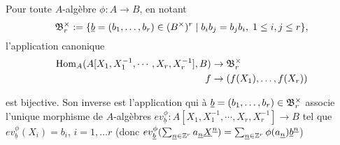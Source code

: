 \begin{definition}Pour toute $A$-algèbre $\phi:A\rightarrow B$, en notant
 $$\frak{B}^\times_r:= \lbrace \underline{b}=(b_1,\dots, b_r)\in (B^\times)^r\;|\; b_ib_j=b_jb_i,\; 1\leq i,j\leq r\rbrace,$$  l'application canonique
	\begin{align*} \operatorname{Hom}_A(A[X_1,X_1^{-1},\cdots, X_r,X_r^{-1}],B) &\to \frak{B}_r^\times \\ f&\to (f(X_1),\dots, f(X_r))\end{align*}

est bijective. Son inverse est l'application qui à $\underline{b}=(b_1,\dots, b_r)\in \frak{B}^\times_r$ associe l'unique morphisme de $A$-algèbres $ev_{\underline{b}}^\phi:A[X_1,X_1^{-1},\cdots, X_r,X_r^{-1}]\rightarrow B$ tel que $ev_{\underline{b}}^\phi(X_i)=b_i$, $i=1,\dots r$ (donc $ev_{\underline{b}}^\phi(\sum_{\underline{n}\in \mathbb{Z}^r}a_{\underline{n}}\underline{X}^{\underline{n}})=\sum_{\underline{n}\in \mathbb{Z}^r}\phi(a_{\underline{n}})\underline{b}^{\underline{n}}$)\end{definition}


